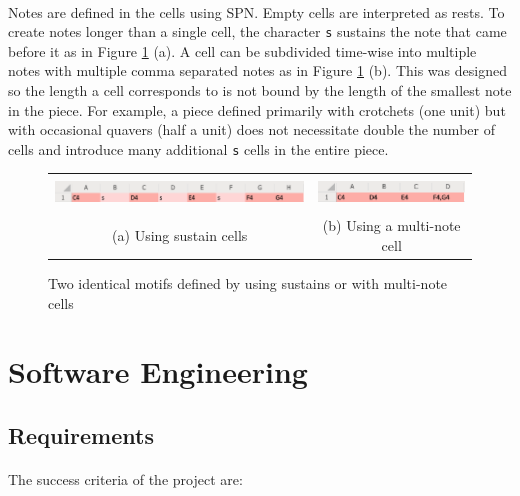 \paragraph{} Notes are defined in the cells using SPN. Empty cells are interpreted as rests. To create notes longer than a single cell, the character \texttt{s} sustains the note that came before it as in Figure \ref{prep:sustainMulti} (a). A cell can be subdivided time-wise into multiple notes with multiple comma separated notes as in Figure \ref{prep:sustainMulti} (b). This was designed so the length a cell corresponds to is not bound by the length of the smallest note in the piece. For example, a piece defined primarily with crotchets (one unit) but with occasional quavers (half a unit) does not necessitate double the number of cells and introduce many additional \texttt{s} cells in the entire piece.

\begin{figure}[ht]
\begin{tabular}{cc}
  \includegraphics[height=8mm]{figs/withoutMulti.png} &
  \includegraphics[height=8mm]{figs/withMulti.png} \\
  (a) Using sustain cells&(b) Using a multi-note cell\\
\end{tabular}
\caption{Two identical motifs defined by using sustains or with multi-note cells}
\label{prep:sustainMulti}
\end{figure}

\section{Software Engineering}

\subsection{Requirements}

\paragraph{} The success criteria of the project are:

